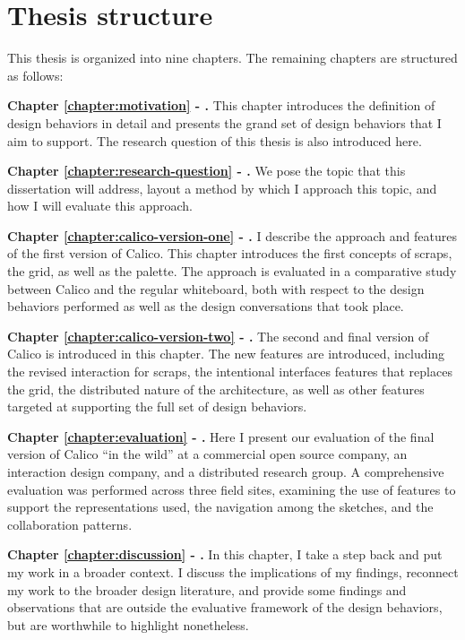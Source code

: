 \documentclass[12pt,fleqn]{ucithesis}
\begin{document}
\section{Thesis structure}

This thesis is organized into nine chapters. The remaining chapters are structured as follows:

\textbf{Chapter \ref{chapter:motivation} - .} This chapter introduces the definition of design behaviors in detail and presents the grand set of design behaviors that I aim to support. The research question of this thesis is also introduced here.

\textbf{Chapter \ref{chapter:research-question} - .} We pose the topic that this dissertation will address, layout a method by which I approach this topic, and how I will evaluate this approach.

\textbf{Chapter \ref{chapter:calico-version-one} - .} I describe the approach and features of the first version of Calico. This chapter introduces the first concepts of scraps, the grid, as well as the palette. The approach is evaluated in a comparative study between Calico and the regular whiteboard, both with respect to the design behaviors performed as well as the design conversations that took place.

\textbf{Chapter \ref{chapter:calico-version-two} - .} The second and final version of Calico is introduced in this chapter. The new features are introduced, including the revised interaction for scraps, the intentional interfaces features that replaces the grid, the distributed nature of the architecture, as well as other features targeted at supporting the full set of design behaviors.

\textbf{Chapter \ref{chapter:evaluation} - .} Here I present our evaluation of the final version of Calico ``in the wild'' at a commercial open source company, an interaction design company, and a distributed research group. A comprehensive evaluation was performed across three field sites, examining the use of features to support the representations used, the navigation among the sketches, and the collaboration patterns.

\textbf{Chapter \ref{chapter:discussion} - .} In this chapter, I take a step back and put my work in a broader context. I discuss the implications of my findings, reconnect my work to the broader design literature, and provide some findings and observations that are outside the evaluative framework of the design behaviors, but are worthwhile to highlight nonetheless. 
\end{document}

